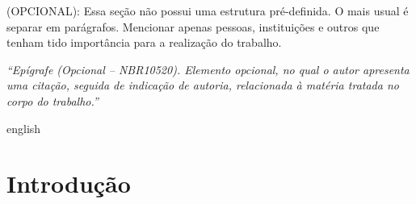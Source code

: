\documentclass[
	12pt,				%
	openright,			%
	oneside,			%
	a4paper,			%
	english,			%
	brazil				%
	]{abntex2}
\begin{document}
\begin{agradecimentos}
(OPCIONAL): Essa seção não possui uma estrutura pré-definida. O mais usual é separar em parágrafos. Mencionar apenas pessoas, instituições e outros que tenham tido importância para a realização do trabalho.

\end{agradecimentos}

\begin{epigrafe}
    \vspace*{\fill}
	\begin{flushright}
		\textit{``Epígrafe (Opcional – NBR10520). Elemento opcional, no qual o autor apresenta uma citação, seguida de indicação de autoria, relacionada à matéria tratada no corpo do trabalho.''}
	\end{flushright}
\end{epigrafe}


\setlength{\absparsep}{18pt} %
\begin{resumo}
	
\end{resumo}

\begin{resumo}[Abstract]
 \begin{otherlanguage*}{english}
	
 \end{otherlanguage*}
\end{resumo}



\tableofcontents*
\cleardoublepage



\textual

\chapter*[Introdução]{Introdução}
\end{document}
